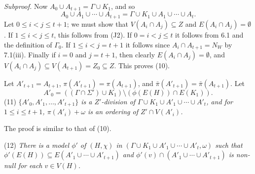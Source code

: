 \textit{Subproof.} Now $A_0 \cup A_{t+1} = \Gamma \cup K_1$, and so
\begin{equation*}
A_0 \cup A_1 \cup \cdots \cup A_{t+1} = \Gamma \cup K_1 \cup A_1 \cup \cdots \cup A_t.
\end{equation*}
Let $0 \le i < j \le t+1$; we must show that $V(A_i \cap A_j) \subseteq Z$ and $E(A_i \cap A_j) = \emptyset$. If $1 \le i < j \le t$, this follows from (J2). If $0 = i < j \le t$ it follows from 6.1 and the definition of $\Gamma_0$. If $1 \le i < j = t+1$ it follows since $A_i \cap A_{t+1} = N_W$ by 7.1(iii). Finally if $i = 0$ and $j = t+1$, then clearly $E(A_i \cap A_j) = \emptyset$, and $V(A_i \cap A_j) \subseteq V(A_{t+1}) = Z_0 \subseteq Z$. This proves (10).

Let $A'_{t+1} = A_{t+1}$, $\pi(A'_{t+1}) = \pi(A_{t+1})$, and $\bar{\pi}(A'_{t+1}) = \bar{\pi}(A_{t+1})$. Let
\begin{equation*}
A'_0 = ((\Gamma \cap \Sigma') \cup K_1) \setminus (\phi(E(H)) \cap E(K_1)).
\end{equation*}
\hspace*{12pt}(11) \textit{$\{A'_0, A'_1, \ldots, A'_{t+1}\}$ is a $Z'$-division of $\Gamma \cup K_1 \cup A'_1 \cup \cdots \cup A'_t$, and for $1 \le i \le t+1$, $\pi(A'_i) + \omega$ is an ordering of $Z' \cap V(A'_i)$.}

The proof is similar to that of (10).

\hspace*{12pt}(12) \textit{There is a model $\phi'$ of $(H, \chi)$ in $(\Gamma \cup K_1 \cup A'_1 \cup \cdots \cup A'_t, \omega)$ such that $\phi'(E(H)) \subseteq E(A'_1 \cup \cdots \cup A'_{t+1})$ and $\phi'(v) \cap (A'_1 \cup \cdots \cup A'_{t+1})$ is non-null for each $v \in V(H)$.}

